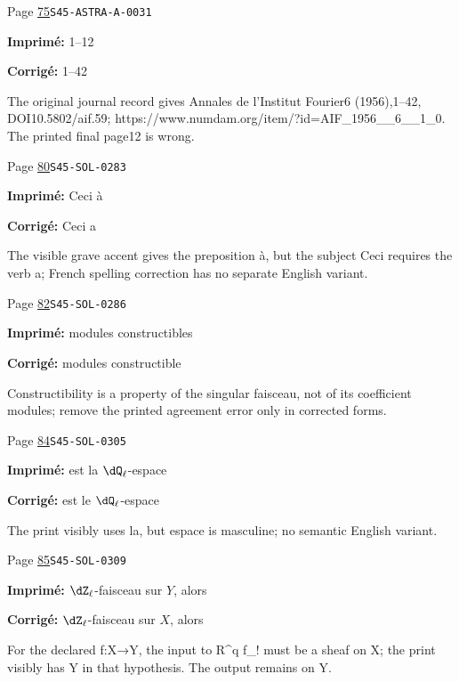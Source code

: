 \begin{description}
\smallskip
\item[\hypertarget{apparatus:FR-0034}{34}] Page \hyperlink{printpage:fr:75}{75}\quad\texttt{S45-ASTRA-A-0031}
\par\noindent\textbf{Imprimé:} 1--12
\par\noindent\textbf{Corrigé:} 1--42
\par\noindent The original journal record gives Annales de l’Institut Fourier6 (1956),1–42, DOI10.5802/aif.59; https://www.numdam.org/item/?id=AIF\_1956\_\_6\_\_1\_0. The printed final page12 is wrong.
\smallskip
\item[\hypertarget{apparatus:FR-0035}{35}] Page \hyperlink{printpage:fr:80}{80}\quad\texttt{S45-SOL-0283}
\par\noindent\textbf{Imprimé:} Ceci à
\par\noindent\textbf{Corrigé:} Ceci a
\par\noindent The visible grave accent gives the preposition à, but the subject Ceci requires the verb a; French spelling correction has no separate English variant.
\smallskip
\item[\hypertarget{apparatus:FR-0036}{36}] Page \hyperlink{printpage:fr:82}{82}\quad\texttt{S45-SOL-0286}
\par\noindent\textbf{Imprimé:} modules constructibles
\par\noindent\textbf{Corrigé:} modules constructible
\par\noindent Constructibility is a property of the singular faisceau, not of its coefficient modules; remove the printed agreement error only in corrected forms.
\smallskip
\item[\hypertarget{apparatus:FR-0037}{37}] Page \hyperlink{printpage:fr:84}{84}\quad\texttt{S45-SOL-0305}
\par\noindent\textbf{Imprimé:} est la $\dQ_\ell$-espace
\par\noindent\textbf{Corrigé:} est le $\dQ_\ell$-espace
\par\noindent The print visibly uses la, but espace is masculine; no semantic English variant.
\smallskip
\item[\hypertarget{apparatus:FR-0038}{38}] Page \hyperlink{printpage:fr:85}{85}\quad\texttt{S45-SOL-0309}
\par\noindent\textbf{Imprimé:} $\dZ_\ell$-faisceau sur $Y$, alors
\par\noindent\textbf{Corrigé:} $\dZ_\ell$-faisceau sur $X$, alors
\par\noindent For the declared f:X→Y, the input to R\textasciicircum{}q f\_! must be a sheaf on X; the print visibly has Y in that hypothesis. The output remains on Y.

\end{description}
